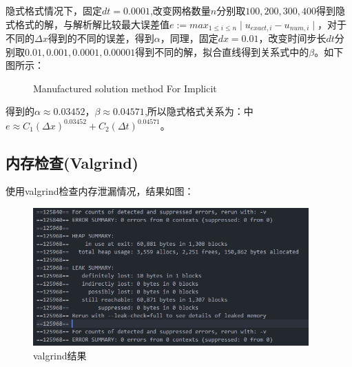 \documentclass[
	20pt%
]{SUSTechHomework}
\begin{document}
\qquad 隐式格式情况下，固定$dt=0.0001$,改变网格数量$n$分别取$100, 200, 300, 400 $得到隐式格式的解，与解析解比较最大误差值$e:=max_{1 \leq i \leq n}\mid u_{exact,i} - u_{num,i}\mid$，对于不同的$\Delta x$得到的不同的误差，得到$\alpha$，同理，固定$dx=0.01$，改变时间步长$dt$分别取$0.01, 0.001, 0.0001, 0.00001$得到不同的解，拟合直线得到关系式中的$\beta$。如下图所示：
\begin{figure}[h]
    \centering
    \caption{Manufactured solution method For Implicit}
    \label{fig:my_label}
\end{figure}

\qquad 得到的$\alpha \approx 0.03452$，$\beta \approx 0.04571$,所以隐式格式关系为：中$e \approx C_1 (\Delta x)^0.03452 + C_2 (\Delta t)^0.04571$。
\subsection{内存检查(Valgrind)}
\qquad 使用valgrind检查内存泄漏情况，结果如图：
\begin{figure}[h]
    \centering
    \includegraphics[width=300pt]{img/valgrind.jpg}
    \caption{valgrind结果}
    \label{fig:my_label}
\end{figure}
\end{document}
